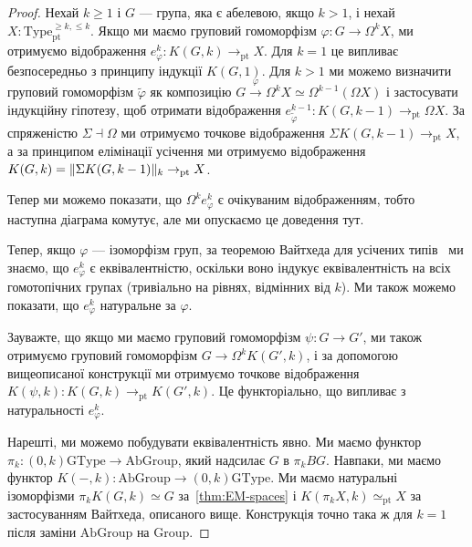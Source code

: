 \documentclass[12pt]{article}
\newcommand*{\Loop}{\Omega}
\newcommand*{\pt}{{\mathrm{pt}}}
\renewcommand*{\equiv}{\mathrel{\simeq}}
\DeclarePairedDelimiter\trunc{\lVert}{\rVert}
\newcommand*{\Type}{\mathrm{Type}}
\newcommand*{\GType}{\mathrm{GType}}
\newcommand*{\Group}{\mathrm{Group}}
\newcommand*{\AbGroup}{\mathrm{AbGroup}}
\renewcommand*{\phi}{\varphi}
\begin{document}
\begin{proof}
  Нехай $k \ge 1$ і $G$ — група, яка є абелевою, якщо $k > 1$, і нехай $X : \Type_\pt^{\ge k, \le k}$. Якщо ми маємо груповий гомоморфізм $\phi : G \to \Loop^k X$, ми отримуємо відображення $e_\phi^k : K(G,k) \to_\pt X$. Для $k=1$ це випливає безпосередньо з принципу індукції $K(G,1)$. Для $k > 1$ ми можемо визначити груповий гомоморфізм $\widetilde\phi$ як композицію $G \xrightarrow{\phi} \Loop^k X \equiv \Loop^{k-1}(\Loop X)$ і застосувати індукційну гіпотезу, щоб отримати відображення $e_{\widetilde\phi}^{k-1} : K(G,k-1) \to_\pt \Loop X$. За спряженістю $\Sigma \dashv \Loop$ ми отримуємо точкове відображення $\Sigma K(G,k-1) \to_\pt X$, а за принципом елімінації усічення ми отримуємо відображення $K(G,k) = \trunc{\Sigma K(G,k-1)}_k \to_\pt X$.

  Тепер ми можемо показати, що $\Loop^k e_\phi^k$ є очікуваним відображенням, тобто наступна діаграма комутує, але ми опускаємо це доведення тут.
  \begin{center}
  \end{center}
  Тепер, якщо $\phi$ — ізоморфізм груп, за теоремою Вайтхеда для усічених типів~\cite[Теорема 8.8.3]{TheBook} ми знаємо, що $e_\phi^k$ є еквівалентністю, оскільки воно індукує еквівалентність на всіх гомотопічних групах (тривіально на рівнях, відмінних від $k$). Ми також можемо показати, що $e_\phi^k$ натуральне за $\phi$.

  Зауважте, що якщо ми маємо груповий гомоморфізм $\psi : G \to G'$, ми також отримуємо груповий гомоморфізм $G \to \Loop^k K(G',k)$, і за допомогою вищеописаної конструкції ми отримуємо точкове відображення $K(\psi,k) : K(G,k) \to_\pt K(G',k)$. Це функторіально, що випливає з натуральності $e_\phi^k$.

  Нарешті, ми можемо побудувати еквівалентність явно. Ми маємо функтор $\pi_k : (0,k)\GType \to \AbGroup$, який надсилає $G$ в $\pi_k BG$. Навпаки, ми маємо функтор $K({-},k) : \AbGroup \to (0,k)\GType$. Ми маємо натуральні ізоморфізми $\pi_k K(G,k) \equiv G$ за~\autoref{thm:EM-spaces} і $K(\pi_k X,k) \equiv_\pt X$ за застосуванням Вайтхеда, описаного вище. Конструкція точно така ж для $k=1$ після заміни $\AbGroup$ на $\Group$.
\end{proof}
\end{document}
